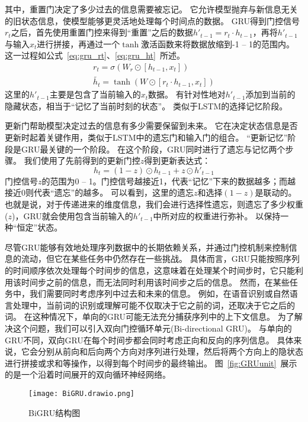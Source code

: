 其中，重置门决定了多少过去的信息需要被忘记。
它允许模型抛弃与新信息无关的旧状态信息，使模型能够更灵活地处理每个时间点的数据。
GRU得到门控信号$r_t$之后，首先使用重置门控来得到“重置”之后的数据$h'_{t-1} = r_t \cdot h_{t-1}$，再将$h'_{t-1}$与输入$x_t$进行拼接，再通过一个$\tanh$激活函数来将数据放缩到-1 -- 1的范围内。
这一过程如公式~\ref{eq:gru_rt}、\ref{eq:gru_ht}~所述。
\begin{gather}
  r_t = σ(W_r \odot [h_{t-1},x_t]) \label{eq:gru_rt} \\
  \tilde{h_t} = \tanh(W \odot [r_t \cdot h_{t-1} , x_t]) \label{eq:gru_ht}
\end{gather}
这里的$h'_{t-1}$主要是包含了当前输入的$x_t$数据。
有针对性地对$h'_{t-1}$添加到当前的隐藏状态，相当于“记忆了当前时刻的状态”。
类似于LSTM的选择记忆阶段。


更新门帮助模型决定过去的信息有多少需要保留到未来。
它在决定状态信息是否更新时起着关键作用，类似于LSTM中的遗忘门和输入门的组合。
“更新记忆”阶段是GRU最关键的一个阶段。
在这个阶段，GRU同时进行了遗忘与记忆两个步骤。
我们使用了先前得到的更新门控$z$得到更新表达式： 
\begin{equation}
  \label{dq:gru_ht}
  h_t = (1-z) \odot h_{t-1} + z \odot h'_{t-1}
\end{equation}
门控信号$z$的范围为0 -- 1。门控信号越接近1，代表“记忆”下来的数据越多；而越接近0则代表“遗忘”的越多。
可以看到，这里的遗忘$z$和选择$(1-z)$是联动的。
也就是说，对于传递进来的维度信息，我们会进行选择性遗忘，则遗忘了多少权重($z$)，GRU就会使用包含当前输入的$h'_{t-1}$中所对应的权重进行弥补。
以保持一种“恒定”状态。


尽管GRU能够有效地处理序列数据中的长期依赖关系，并通过门控机制来控制信息的流动，但它在某些任务中仍然存在一些挑战。
具体而言，GRU只能按照序列的时间顺序依次处理每个时间步的信息，这意味着在处理某个时间步时，它只能利用该时间步之前的信息，而无法同时利用该时间步之后的信息。
然而，在某些任务中，我们需要同时考虑序列中过去和未来的信息。
例如，在语音识别或自然语言处理中，当前词的识别或理解可能不仅取决于它之前的词，还取决于它之后的词。
在这种情况下，单向的GRU可能无法充分捕获序列中的上下文信息。
为了解决这个问题，我们可以引入双向门控循环单元(Bi-directional GRU)。
与单向的GRU不同，双向GRU在每个时间步都会同时考虑正向和反向的序列信息。
具体来说，它会分别从前向和后向两个方向对序列进行处理，然后将两个方向上的隐状态进行拼接或求和等操作，以得到每个时间步的最终输出。
图~\ref{fig:GRUunit}~展示的是一个沿着时间展开的双向循环神经网络。
\begin{figure}[h]
  \centering
  \texttt{[image: BiGRU.drawio.png]}
  \caption{BiGRU结构图}
  \label{fig:BiGRU}
\end{figure}

